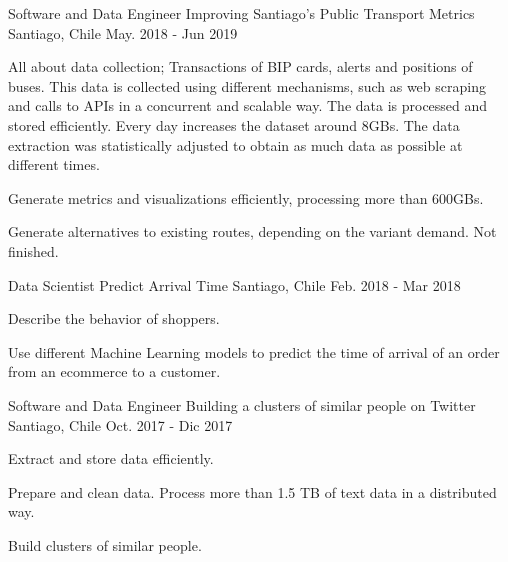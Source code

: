 

\begin{cventries}

  \cventry
    {Software and Data Engineer} %
    {Improving Santiago's Public Transport Metrics} %
    {Santiago, Chile} %
    {May. 2018 - Jun 2019} %
    {
      \begin{cvitems} %
        \item {All about data collection; Transactions of BIP cards, alerts and positions of buses. This data is collected using different mechanisms, such as web scraping and calls to APIs in a concurrent and scalable way. The data is processed and stored efficiently. Every day increases the dataset around 8GBs. The data extraction was statistically adjusted to obtain as much data as possible at different times.}
        \item {Generate metrics and visualizations efficiently, processing more than 600GBs.}
	    \item {Generate alternatives to existing routes, depending on the variant demand. Not finished.}
      \end{cvitems}
    }

  \cventry
    {Data Scientist} %
    {Predict Arrival Time} %
    {Santiago, Chile} %
    {Feb. 2018 - Mar 2018} %
    {
      \begin{cvitems} %
        \item {Describe the behavior of shoppers.}
		\item {Use different Machine Learning models to predict the time of arrival of an order from an ecommerce to a customer.}
      \end{cvitems}
    }
  \cventry
    {Software and Data Engineer} %
    {Building a clusters of similar people on Twitter} %
    {Santiago, Chile} %
    {Oct. 2017 - Dic 2017} %
    {
      \begin{cvitems} %
		\item {Extract and store data efficiently.}
        \item {Prepare and clean data. Process more than 1.5 TB of text data in a distributed way.}
        \item {Build clusters of similar people.}
      \end{cvitems}
    }
\end{cventries}
